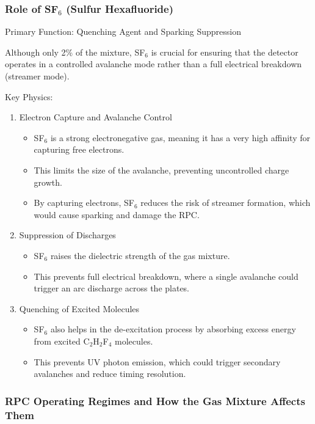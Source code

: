 \subsubsection{Role of SF$_6$ (Sulfur Hexafluoride)}
Primary Function: Quenching Agent and Sparking Suppression

Although only 2\% of the mixture, SF$_6$ is crucial for ensuring that the detector operates in a controlled avalanche mode rather than a full electrical breakdown (streamer mode).

Key Physics:

\begin{enumerate}
	\item Electron Capture and Avalanche Control
	\begin{itemize}
		\item SF$_6$ is a strong electronegative gas, meaning it has a very high affinity for capturing free electrons.
		\item This limits the size of the avalanche, preventing uncontrolled charge growth.
		\item By capturing electrons, SF$_6$ reduces the risk of streamer formation, which would cause sparking and damage the RPC.
	\end{itemize}
	\item Suppression of Discharges
	\begin{itemize}
		\item SF$_6$ raises the dielectric strength of the gas mixture.
		\item This prevents full electrical breakdown, where a single avalanche could trigger an arc discharge across the plates.
	\end{itemize}
	\item Quenching of Excited Molecules
	\begin{itemize}
		\item SF$_6$ also helps in the de-excitation process by absorbing excess energy from excited C$_2$H$_2$F$_4$ molecules.
		\item This prevents UV photon emission, which could trigger secondary avalanches and reduce timing resolution.
	\end{itemize}
\end{enumerate}

\subsubsection{RPC Operating Regimes and How the Gas Mixture Affects Them}

